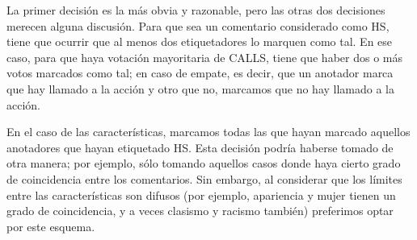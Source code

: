 La primer decisión es la más obvia y razonable, pero las otras dos decisiones merecen alguna discusión. Para que sea un comentario considerado como HS, tiene que ocurrir que al menos dos etiquetadores lo marquen como tal. En ese caso, para que haya votación mayoritaria de CALLS, tiene que haber dos o más votos marcados como tal; en caso de empate, es decir, que un anotador marca que hay llamado a la acción y otro que no, marcamos que no hay llamado a la acción.

En el caso de las características, marcamos todas las que hayan marcado aquellos anotadores que hayan etiquetado HS. Esta decisión podría haberse tomado de otra manera; por ejemplo, sólo tomando aquellos casos donde haya cierto grado de coincidencia entre los comentarios. Sin embargo, al considerar que los límites entre las características son difusos (por ejemplo, apariencia y mujer tienen un grado de coincidencia, y a veces clasismo y racismo también) preferimos optar por este esquema.

